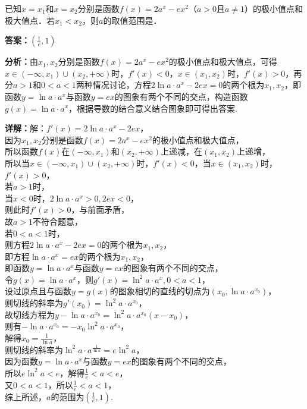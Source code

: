 \begin{question}[points=5]
已知$x=x_1$和$x=x_2$分别是函数$f(x)=2a^x - ex^2$（$a>0$且$a\neq1$）的极小值点和极大值点．若$x_1<x_2$，则$a$的取值范围是．
\begin{solution}
\textbf{答案：}$\left(\frac{1}{e},1\right)$

\textbf{分析：}由$x_1,x_2$分别是函数$f(x)=2a^x-ex^2$的极小值点和极大值点，可得$x\in(-\infty,x_1)\cup(x_2,+\infty)$时，$f'(x)<0$，$x\in(x_1,x_2)$时，$f'(x)>0$，再分$a>1$和$0<a<1$两种情况讨论，方程$2\ln a\cdot a^x - 2ex = 0$的两个根为$x_1,x_2$，即函数$y=\ln a\cdot a^x$与函数$y=ex$的图象有两个不同的交点，构造函数$g(x)=\ln a\cdot a^x$，根据导数的结合意义结合图象即可得出答案.

\textbf{详解：}解：$f'(x)=2\ln a\cdot a^x - 2ex$，\\因为$x_1,x_2$分别是函数$f(x)=2a^x-ex^2$的极小值点和极大值点，\\所以函数$f(x)$在$(-\infty,x_1)$和$(x_2,+\infty)$上递减，在$(x_1,x_2)$上递增，\\所以当$x\in(-\infty,x_1)\cup(x_2,+\infty)$时，$f'(x)<0$，当$x\in(x_1,x_2)$时，$f'(x)>0$，\\若$a>1$时，\\当$x<0$时，$2\ln a\cdot a^x>0, 2ex<0$，\\则此时$f'(x)>0$，与前面矛盾，\\故$a>1$不符合题意，\\若$0<a<1$时，\\则方程$2\ln a\cdot a^x - 2ex = 0$的两个根为$x_1,x_2$，\\即方程$\ln a\cdot a^x = ex$的两个根为$x_1,x_2$，\\即函数$y=\ln a\cdot a^x$与函数$y=ex$的图象有两个不同的交点，\\令$g(x)=\ln a\cdot a^x$，则$g'(x)=\ln^2 a\cdot a^x, 0<a<1$，\\设过原点且与函数$y=g(x)$的图象相切的直线的切点为$(x_0,\ln a\cdot a^{x_0})$，\\则切线的斜率为$g'(x_0)=\ln^2 a\cdot a^{x_0}$，\\故切线方程为$y-\ln a\cdot a^{x_0}=\ln^2 a\cdot a^{x_0}(x-x_0)$，\\则有$-\ln a\cdot a^{x_0} = -x_0\ln^2 a\cdot a^{x_0}$，\\解得$x_0=\frac{1}{\ln a}$，\\则切线的斜率为$\ln^2 a\cdot a^{\frac{1}{\ln a}} = e\ln^2 a$，\\因为函数$y=\ln a\cdot a^x$与函数$y=ex$的图象有两个不同的交点，\\所以$e\ln^2 a < e$，解得$\frac{1}{e}<a<e$，\\又$0<a<1$，所以$\frac{1}{e}<a<1$，\\综上所述，$a$的范围为$\left(\frac{1}{e},1\right)$.
\end{solution}
\end{question}

